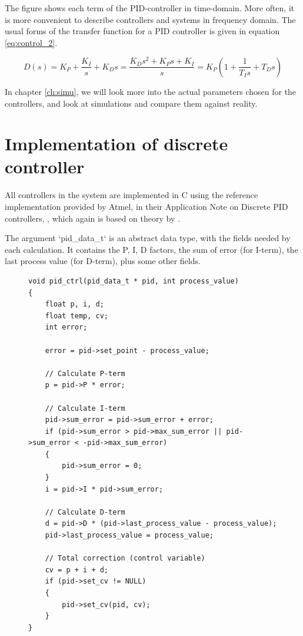 The figure shows each term of the PID-controller in time-domain. More often, it is more convenient to describe controllers and systems in frequency domain. The usual forms of the transfer function for a PID controller is given in equation \ref{eq:control_2}.

\begin{equation}\label{eq:control_2}
	D(s) = K_P + \frac{K_I}{s} + K_D s = \frac{K_Ds^2 + K_Ps + K_I}{s} = K_P(1 + \frac{1}{T_Is} + T_Ds)
\end{equation}

In chapter \ref{ch:simu}, we will look more into the actual parameters chosen for the controllers, and look at simulations and compare them against reality. 


%
%
%
%
\section{Implementation of discrete controller}

All controllers in the system are implemented in C using the reference implementation provided by Atmel, in their Application Note on Discrete PID controllers, \citep{avr221}, which again is based on theory by \citep{aastrom1995}.  

The argument `pid\_data\_t` is an abstract data type, with the fields needed by each calculation. It contains the P, I, D factors, the sum of error (for I-term), the last process value (for D-term), plus some other fields. 

\lstset{language=C,basicstyle=\tiny,numbers=left}
\begin{figure}
\begin{lstlisting}[frame=single,caption=Implementation of discrete PID controller,label=lst:control_1]
void pid_ctrl(pid_data_t * pid, int process_value)
{
	float p, i, d;
	float temp, cv;
	int error;

	error = pid->set_point - process_value;
	
	// Calculate P-term
	p = pid->P * error;

	// Calculate I-term
	pid->sum_error = pid->sum_error + error;
	if (pid->sum_error > pid->max_sum_error || pid->sum_error < -pid->max_sum_error)
	{
		pid->sum_error = 0;
	}
	i = pid->I * pid->sum_error;

	// Calculate D-term
	d = pid->D * (pid->last_process_value - process_value);
	pid->last_process_value = process_value;

	// Total correction (control variable)
	cv = p + i + d;
	if (pid->set_cv != NULL)
	{
		pid->set_cv(pid, cv);
	}
}
\end{lstlisting}
\end{figure}

